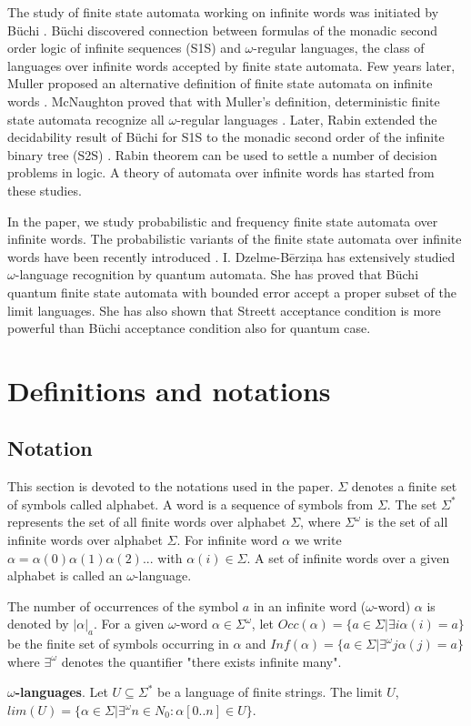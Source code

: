 \documentclass{llncs}
\begin{document}
The study of finite state automata working on infinite words was initiated by B\"uchi \cite{Bu60}. B\"uchi discovered connection between formulas of the monadic second order logic of infinite sequences (S1S) and $\omega$-regular languages, the class of languages over infinite words accepted by finite state automata. Few years later, Muller proposed an alternative definition of finite state automata on infinite words \cite{Mu63}. McNaughton proved that with Muller's definition, deterministic finite state automata recognize all $\omega$-regular languages \cite{Mc66}. Later, Rabin extended the decidability result of B\"uchi for S1S to the monadic second order of the infinite binary tree (S2S) \cite{Ra69}. Rabin theorem can be used to settle a number of decision problems in logic. A theory of automata over infinite words has started from these studies.

In the paper, we study probabilistic and frequency finite state automata over infinite words. The probabilistic variants of the finite state automata over infinite words have been recently introduced \cite{BG05}. I. Dzelme-B\= erzi\c na has extensively studied $\omega$-language recognition by quantum automata. She has proved that B\"uchi quantum finite state  automata with bounded error accept a proper subset of the limit languages. She has also shown that Streett acceptance condition is more powerful than B\"uchi acceptance condition also for quantum case. 

\section{Definitions and notations}
%
\subsection{Notation}
%
This section is devoted to the notations used in the paper. $\Sigma$ denotes a finite set of symbols called alphabet. A word is a sequence of symbols from $\Sigma$. The set $\Sigma^{*}$ represents the set of all finite words over alphabet $\Sigma$, where $\Sigma^{\omega}$ is the set of all infinite words over alphabet $\Sigma$. For infinite word $\alpha$ we write $\alpha = \alpha(0) \alpha(1) \alpha(2)...$ with $\alpha(i) \in \Sigma$. A set of infinite words over a given alphabet is called an $\omega$-language.

The number of occurrences of the symbol $a$ in an infinite word ($\omega$-word) $\alpha$ is denoted by $|\alpha|_a$. For a given $\omega$-word $\alpha \in \Sigma^{\omega}$, let $Occ(\alpha)=\{a \in \Sigma | \exists i \alpha(i) = a\}$ be the finite set of symbols occurring in $\alpha$ and $Inf(\alpha) = \{ a \in \Sigma | \exists^\omega j \alpha(j) = a\}$  where $\exists^\omega$ denotes the quantifier "there exists infinite many".
%
\begin{definition}
\textbf{$\omega$-languages}. Let $U \subseteq \Sigma^{*}$ be a language of finite strings. The limit $U$, $lim(U) = \{\alpha \in \Sigma | \exists^{\omega} n \in N_0: \alpha[0..n] \in U\}$.
\end{definition}
\end{document}
